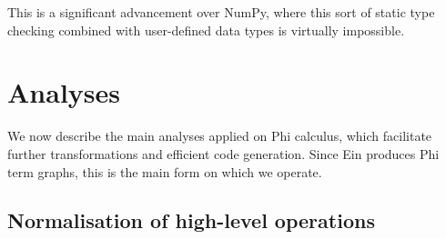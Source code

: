 This is a significant advancement over NumPy, where this sort of static type checking combined with user-defined data types is virtually impossible.



\section{Analyses}
\label{compiler-analyses}

We now describe the main analyses applied on Phi calculus, which facilitate further transformations and efficient code generation. Since Ein produces Phi term graphs, this is the main form on which we operate.

\subsection{Normalisation of high-level operations}

\todothis





